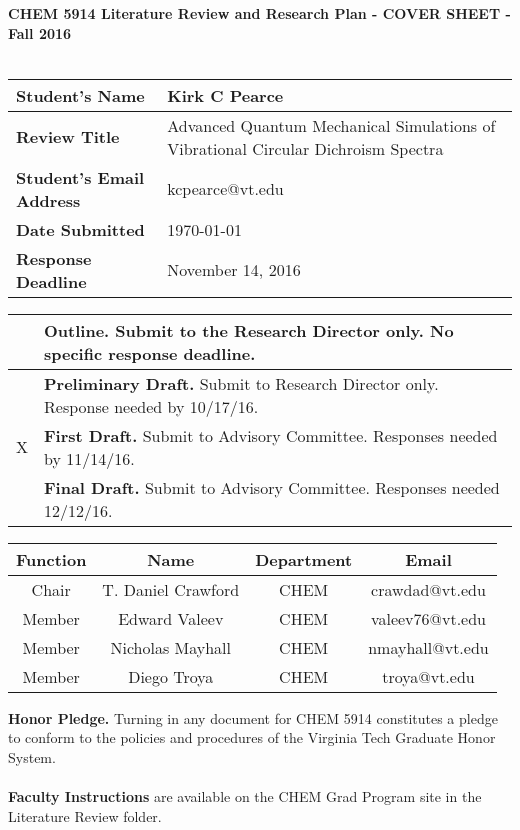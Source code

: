 
\begin{table}
\centering
{\bf CHEM 5914 Literature Review and Research Plan - COVER SHEET - Fall 2016} \\~\\
\renewcommand{\arraystretch}{1.5}
\begin{tabular}{|l|l|}
    \hline
    {\bf Student's Name} & Kirk C Pearce \\
    \hline
    {\bf Review Title} & \multicolumn{1}{m{10cm}|}{Advanced Quantum Mechanical Simulations of Vibrational Circular Dichroism Spectra} \\
    \hline
    {\bf Student's Email Address} & kcpearce@vt.edu \\
    \hline
    {\bf Date Submitted} & \today \\
    \hline
    {\bf Response Deadline} & November 14, 2016 \\
    \hline
\end{tabular}

\vspace{10mm}

\begin{tabular}{|c|l|}
    \hline
    & {\bf Outline.} Submit to the Research Director only. No specific response deadline. \\
    \hline
    & {\bf Preliminary Draft.} Submit to Research Director only. Response needed by 10/17/16. \\
    \hline
    X & {\bf First Draft.} Submit to Advisory Committee. Responses needed by 11/14/16. \\
    \hline
    & {\bf Final Draft.} Submit to Advisory Committee. Responses needed 12/12/16. \\
    \hline
\end{tabular}

\vspace{10mm}

\begin{tabular}{|c|c|c|c|}
    \hline
    {\bf Function} & {\bf Name} & {\bf Department} & {\bf Email} \\
    \hline
    Chair & T. Daniel Crawford & CHEM & crawdad@vt.edu \\
    \hline
    Member & Edward Valeev & CHEM & valeev76@vt.edu \\
    \hline
    Member & Nicholas Mayhall & CHEM & nmayhall@vt.edu \\
    \hline
    Member & Diego Troya & CHEM & troya@vt.edu \\
    \hline
\end{tabular}
\end{table}
\begin{singlespacing}
\noindent
{\bf Honor Pledge.} Turning in any document for CHEM 5914 constitutes a pledge to conform to the policies and procedures of the Virginia Tech Graduate Honor System. \\~\\
{\bf Faculty Instructions} are available on the CHEM Grad Program site in the Literature Review folder.
\end{singlespacing}




